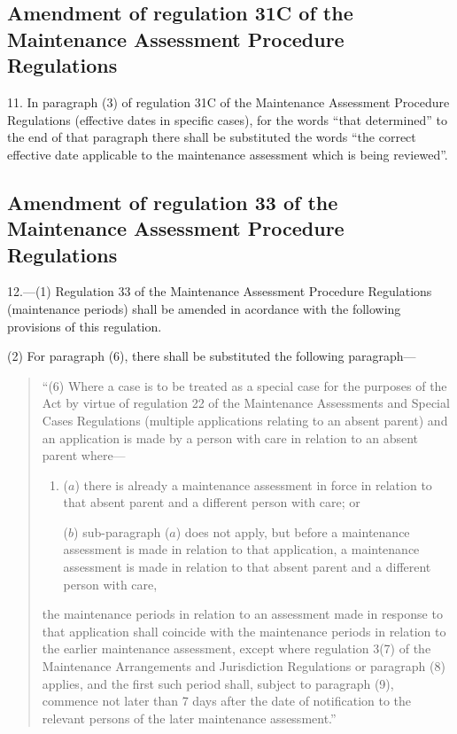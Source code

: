 \documentclass[a4paper]{article}
\begin{document}
\subsection[11. Amendment of regulation 31C of the Maintenance Assessment Procedure Regulations]{Amendment of regulation 31C of the Maintenance Assessment Procedure Regulations}

11.  In paragraph (3) of regulation 31C of the Maintenance Assessment Procedure Regulations (effective dates in specific cases), for the words “that determined” to the end of that paragraph there shall be substituted the words “the correct effective date applicable to the maintenance assessment which is being reviewed”.

\subsection[12. Amendment of regulation 33 of the Maintenance Assessment Procedure Regulations]{Amendment of regulation 33 of the Maintenance Assessment Procedure Regulations}

12.—(1) Regulation 33 of the Maintenance Assessment Procedure Regulations (maintenance periods) shall be amended in acordance with the following provisions of this regulation.

(2) For paragraph (6), there shall be substituted the following paragraph—
\begin{quotation}
“(6) Where a case is to be treated as a special case for the purposes of the Act by virtue of regulation 22 of the Maintenance Assessments and Special Cases Regulations (multiple applications relating to an absent parent) and an application is made by a person with care in relation to an absent parent where—
\begin{enumerate}\item[]
($a$) there is already a maintenance assessment in force in relation to that absent parent and a different person with care; or

($b$) sub-paragraph ($a$) does not apply, but before a maintenance assessment is made in relation to that application, a maintenance assessment is made in relation to that absent parent and a different person with care,
\end{enumerate}
the maintenance periods in relation to an assessment made in response to that application shall coincide with the maintenance periods in relation to the earlier maintenance assessment, except where regulation 3(7) of the Maintenance Arrangements and Jurisdiction Regulations or paragraph (8) applies, and the first such period shall, subject to paragraph (9), commence not later than 7 days after the date of notification to the relevant persons of the later maintenance assessment.”
\end{quotation}
\end{document}

